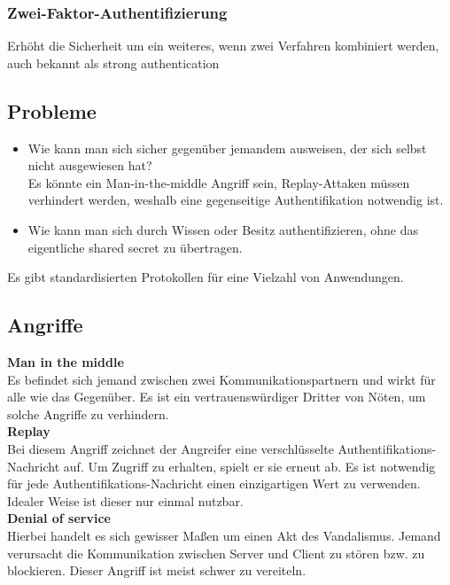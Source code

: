 \documentclass{article} %
\begin{document}
\subsubsection{Zwei-Faktor-Authentifizierung}
Erhöht die Sicherheit um ein weiteres, wenn zwei Verfahren kombiniert werden, auch bekannt als \glqq strong authentication\grqq


\subsection{Probleme}
	\begin{itemize}
	\item Wie kann man sich sicher gegenüber jemandem ausweisen, der sich selbst nicht ausgewiesen hat? \\
	Es könnte ein Man-in-the-middle Angriff sein, Replay-Attaken müssen verhindert werden, weshalb eine gegenseitige Authentifikation notwendig ist.
	\item Wie kann man sich durch Wissen oder Besitz authentifizieren, ohne das eigentliche shared secret zu übertragen.
	\end{itemize}
Es gibt standardisierten Protokollen für eine Vielzahl von Anwendungen.
\subsection{Angriffe}
\noindent\textbf{Man in the middle}\\
Es befindet sich jemand zwischen zwei Kommunikationspartnern und wirkt für alle wie das Gegenüber. Es ist ein vertrauenswürdiger Dritter von Nöten, um solche Angriffe zu verhindern.\\

\noindent\textbf{Replay}\\
Bei diesem Angriff zeichnet der Angreifer eine verschlüsselte Authentifikations-Nachricht auf. Um Zugriff zu erhalten, spielt er sie erneut ab. Es ist notwendig für jede Authentifikations-Nachricht einen einzigartigen Wert zu verwenden. Idealer Weise ist dieser nur einmal nutzbar.\\

\noindent\textbf{Denial of service}\\
Hierbei handelt es sich gewisser Maßen um einen Akt des Vandalismus. Jemand verursacht die Kommunikation zwischen Server und Client zu stören bzw. zu blockieren. Dieser Angriff ist meist schwer zu vereiteln.
\end{document}
